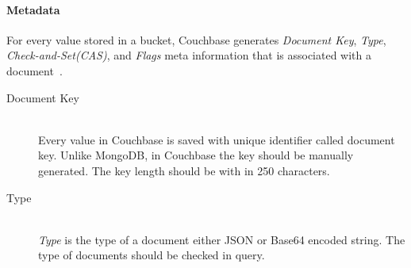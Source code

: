 \paragraph{Metadata}\label{cb-metadata}
For every value stored in a bucket, Couchbase generates \textit{Document Key}, \textit{Type}, \textit{Check-and-Set(CAS)}, and \textit{Flags}  meta information that is associated with a document~\cite[p. 26]{cb/ostrovsky2014pro}. 
\begin{description}
\item[Document Key] \hfill \\
 Every value in Couchbase is saved with unique identifier called document key. Unlike MongoDB, in Couchbase the key should be manually generated. The key length should be with in 250 characters.
 
 
\item[Type] \hfill \\
 \textit{Type} is the type of a document either JSON or Base64 encoded string. The type of documents should be checked in query. 
 

\end{description}	

